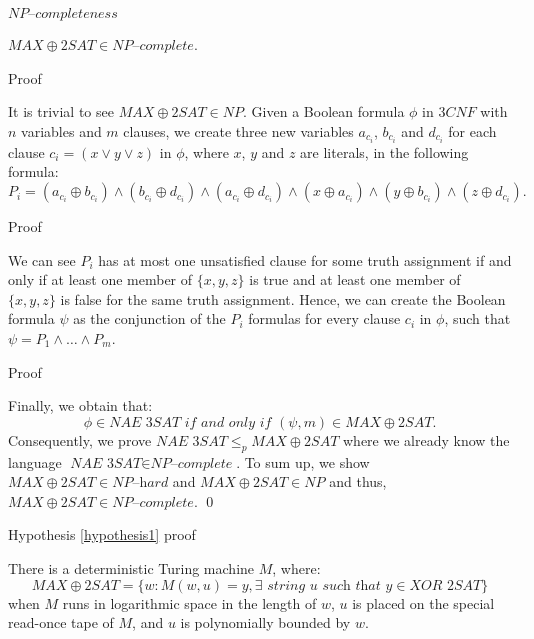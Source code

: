 \documentclass[11pt]{beamer}
\begin{document}
\begin{frame}{$\textit{NP--completeness}$}

\begin{theorem}
\label{completeness}
$MAX\oplus2SAT \in \textit{NP--complete}$.
\end{theorem}

\end{frame}

\begin{frame}{Proof}

It is trivial to see $MAX\oplus2SAT \in NP$. Given a Boolean formula $\phi$ in $3CNF$ with $n$ variables and $m$ clauses, we create three new variables $a_{c_{i}}$, $b_{c_{i}}$ and $d_{c_{i}}$ for each clause $c_{i} = (x \vee y \vee z)$ in $\phi$, where $x$, $y$ and $z$ are literals, in the following formula:
\[P_{i} = (a_{c_{i}} \oplus b_{c_{i}}) \wedge (b_{c_{i}} \oplus d_{c_{i}}) \wedge (a_{c_{i}} \oplus d_{c_{i}}) \wedge (x \oplus a_{c_{i}}) \wedge (y \oplus b_{c_{i}}) \wedge (z \oplus d_{c_{i}}).\]

\end{frame}

\begin{frame}{Proof}

We can see $P_{i}$ has at most one unsatisfied clause for some truth assignment if and only if at least one member of $\{x,y,z\}$ is true and at least one member of $\{x,y,z\}$ is false for the same truth assignment. Hence, we can create the Boolean formula $\psi$ as the conjunction of the $P_{i}$ formulas for every clause $c_{i}$ in $\phi$, such that $\psi = P_{1} \wedge \ldots \wedge P_{m}$.

\end{frame}

\begin{frame}{Proof}

Finally, we obtain that:
\[\phi \in \textit{NAE 3SAT} \textit{ if and only if } (\psi, m) \in MAX\oplus2SAT.\]
Consequently, we prove $\textit{NAE 3SAT} \leq_{p} MAX\oplus2SAT$ where we already know the language $\textit{NAE 3SAT} \in \textit{NP--complete}$. To sum up, we show $MAX\oplus2SAT \in \textit{NP--hard}$ and $MAX\oplus2SAT \in NP$ and thus, $MAX\oplus2SAT \in \textit{NP--complete}$. \qed

\end{frame}

\begin{frame}{Hypothesis \ref{hypothesis1} proof}

\begin{theorem}
\label{proof}
There is a deterministic Turing machine $M$, where:
\[MAX\oplus2SAT = \{w: M(w, u) = y, \exists \textit{ string } u \textit{ such that } y \in \textit{XOR 2SAT}\}\]
when $M$ runs in logarithmic space in the length of $w$, $u$ is placed on the special read-once tape of $M$, and $u$ is polynomially bounded by $w$.
\end{theorem}

\end{frame}
\end{document}
